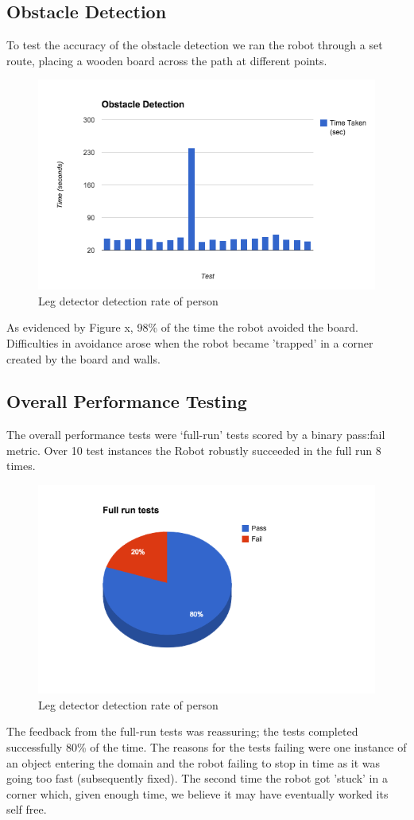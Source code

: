 \documentclass{article}
\begin{document}
	\subsection{Obstacle Detection}
	To test the accuracy of the obstacle detection we ran the robot through a set route, placing a wooden board across the path at different points.
	\begin{figure}[H]
	\centering
	\includegraphics[width=\linewidth]{ExperimentalResults12}
	\caption{Leg detector detection rate of person}
	\end{figure}
	As evidenced by Figure x, 98\% of the time the robot avoided the board. Difficulties in avoidance arose when the robot became 'trapped' in a corner created by the board and walls.
	
	\subsection{Overall Performance Testing}
	The overall performance tests were ‘full-run’ tests scored by a binary pass:fail metric. Over 10 test instances the Robot robustly succeeded in the full run 8 times. 
	\begin{figure}[H]
	\centering
	\includegraphics[width=\linewidth]{ExperimentalResults13}
	\caption{Leg detector detection rate of person}
	\end{figure}
	The feedback from the full-run tests was reassuring; the tests completed successfully 80\% of the time. The reasons for the tests failing were one instance of an object entering the domain and the robot failing to stop in time as it was going too fast (subsequently fixed). The second time the robot got 'stuck' in a corner which, given enough time, we believe it may have eventually worked its self free.
\end{document}

